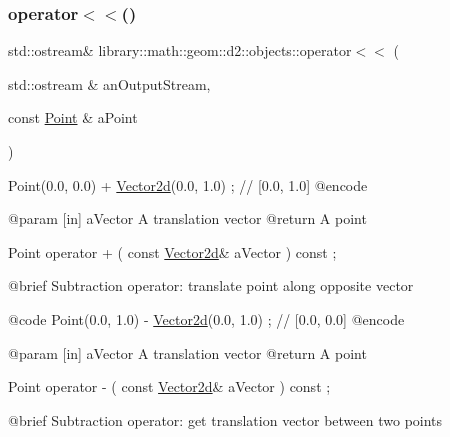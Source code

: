 \subsubsection{\texorpdfstring{operator$<$$<$()}{operator<<()}\hspace{0.1cm}{\footnotesize\ttfamily [1/2]}}
{\footnotesize\ttfamily std\+::ostream\& library\+::math\+::geom\+::d2\+::objects\+::operator$<$$<$ (\begin{DoxyParamCaption}\item[{std\+::ostream \&}]{an\+Output\+Stream,  }\item[{const \hyperlink{classlibrary_1_1math_1_1geom_1_1d2_1_1objects_1_1_point}{Point} \&}]{a\+Point }\end{DoxyParamCaption})}


\begin{DoxyCode}
                        Point(0.0, 0.0) + \hyperlink{namespacelibrary_1_1math_1_1obj_a2fa27512c4f4b07db35d602cfdd2c293}{Vector2d}(0.0, 1.0) ; \textcolor{comment}{// [0.0, 1.0]}
    @encode
   
    @param              [in] aVector A translation vector
    @\textcolor{keywordflow}{return}             A point

Point                   operator +                                  (   \textcolor{keyword}{const}   
      \hyperlink{namespacelibrary_1_1math_1_1obj_a2fa27512c4f4b07db35d602cfdd2c293}{Vector2d}&                   aVector                                     ) \textcolor{keyword}{const} ;

    @brief              Subtraction \textcolor{keyword}{operator}: translate point along opposite vector
   
    @code
                        Point(0.0, 1.0) - \hyperlink{namespacelibrary_1_1math_1_1obj_a2fa27512c4f4b07db35d602cfdd2c293}{Vector2d}(0.0, 1.0) ; \textcolor{comment}{// [0.0, 0.0]}
    @encode
   
    @param              [in] aVector A translation vector
    @\textcolor{keywordflow}{return}             A point

Point                   operator -                                  (   \textcolor{keyword}{const}   
      \hyperlink{namespacelibrary_1_1math_1_1obj_a2fa27512c4f4b07db35d602cfdd2c293}{Vector2d}&                   aVector                                     ) \textcolor{keyword}{const} ;

    @brief              Subtraction \textcolor{keyword}{operator}: \textcolor{keyword}{get} translation vector between two points
   

\end{DoxyCode}
